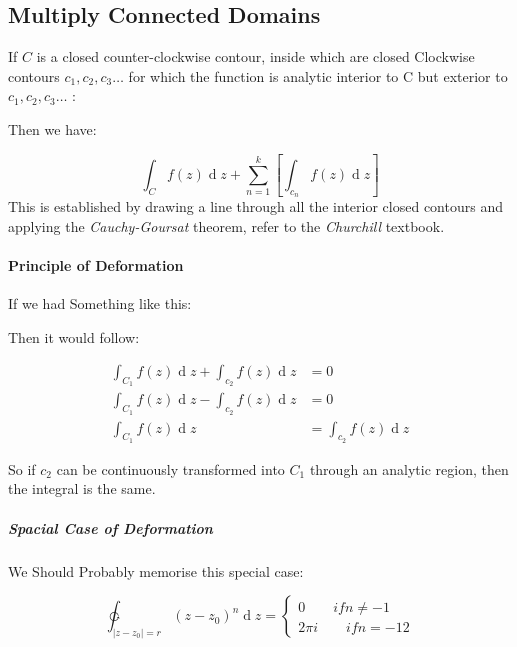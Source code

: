 \documentclass[class=article, crop=false]{standalone}
\begin{document}
\hypertarget{multiply-connected-domains}{%
\subsection{Multiply Connected
Domains}\label{multiply-connected-domains}}

If \(C\) is a closed counter-clockwise contour, inside which are closed
Clockwise contours \(c_1, c_2, c_3 \dots\) for which the function is
analytic interior to C but exterior to \(c_1, c_2, c_3 \dots\) :

Then we have:

\[\int^{}_{C} f\left( z \right)   \operatorname{d}z + \sum^{k}_{n= 1} \left[ \int^{}_{c_n} f\left( z \right)   \operatorname{d}z  \right]\]
This is established by drawing a line through all the interior closed
contours and applying the \emph{Cauchy-Goursat} theorem, refer to the
\emph{Churchill} textbook.

\hypertarget{principle-of-deformation}{%
\paragraph{Principle of Deformation}\label{principle-of-deformation}}

If we had Something like this:

Then it would follow:

\[\begin{aligned}
  \int^{}_{C_1} f\left( z \right)   \operatorname{d}z + \int^{}_{c_2} f\left( z \right)   \operatorname{d}z &= 0\\  
  \int^{}_{C_1} f\left( z \right)   \operatorname{d}z - \int^{}_{c_2} f\left( z \right)   \operatorname{d}z &= 0\\
  \int^{}_{C_1} f\left( z \right)   \operatorname{d}z &= \int^{}_{c_2} f\left( z \right)   \operatorname{d}z  \end{aligned}\]

So if \(c_2\) can be continuously transformed into \(C_1\) through an
analytic region, then the integral is the same.

\hypertarget{spacial-case-of-deformation}{%
\subparagraph{Spacial Case of
Deformation}\label{spacial-case-of-deformation}}

We Should Probably memorise this special case:

\[\ointctrclockwise_{    \left| z - z_0 \right| = r} \left( z- z_0 \right) ^n  \operatorname{d}z =
\begin{cases}
  0 \qquad if n \neq - 1\\
  2\pi i \qquad if n = - 12
\end{cases}\]
\end{document}

